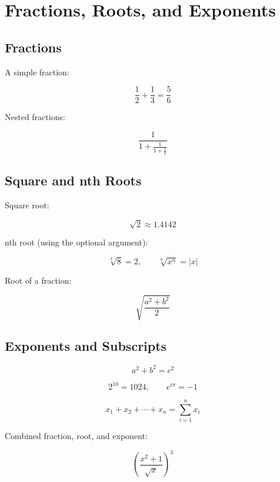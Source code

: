 \documentclass[12pt, a4paper]{article}
\begin{document}
\section*{Fractions, Roots, and Exponents}

\subsection*{Fractions}

A simple fraction:

\[
  \frac{1}{2} + \frac{1}{3} = \frac{5}{6}
\]

Nested fractions:

\[
  \frac{1}{1 + \frac{1}{1 + \frac{1}{2}}}
\]

\subsection*{Square and nth Roots}

Square root:

\[
  \sqrt{2} \approx 1.4142
\]

nth root (using the optional argument):

\[
  \sqrt[3]{8} = 2, \qquad \sqrt[n]{x^n} = |x|
\]

Root of a fraction:

\[
  \sqrt{\frac{a^2 + b^2}{2}}
\]

\subsection*{Exponents and Subscripts}

\[
  a^2 + b^2 = c^2
\]

\[
  2^{10} = 1024, \qquad e^{i\pi} = -1
\]

\[
  x_1 + x_2 + \cdots + x_n = \sum_{i=1}^{n} x_i
\]

Combined fraction, root, and exponent:

\[
  \left( \frac{x^2 + 1}{\sqrt{x}} \right)^{3}
\]
\end{document}
